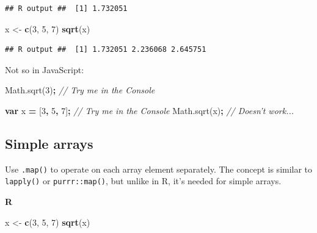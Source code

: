 \documentclass[openany]{book}
\newenvironment{Shaded}{\begin{snugshade}}{\end{snugshade}}
\newcommand{\AttributeTok}[1]{\textcolor[rgb]{0.77,0.63,0.00}{#1}}
\newcommand{\CommentTok}[1]{\textcolor[rgb]{0.56,0.35,0.01}{\textit{#1}}}
\newcommand{\DecValTok}[1]{\textcolor[rgb]{0.00,0.00,0.81}{#1}}
\newcommand{\KeywordTok}[1]{\textcolor[rgb]{0.13,0.29,0.53}{\textbf{#1}}}
\newcommand{\NormalTok}[1]{#1}
\newcommand{\OperatorTok}[1]{\textcolor[rgb]{0.81,0.36,0.00}{\textbf{#1}}}
\newcommand{\StringTok}[1]{\textcolor[rgb]{0.31,0.60,0.02}{#1}}
\newcommand{\VariableTok}[1]{\textcolor[rgb]{0.00,0.00,0.00}{#1}}
\begin{document}
\begin{verbatim}
## R output ##  [1] 1.732051
\end{verbatim}

\begin{Shaded}
\begin{Highlighting}[]
\NormalTok{x <-}\StringTok{ }\KeywordTok{c}\NormalTok{(}\DecValTok{3}\NormalTok{, }\DecValTok{5}\NormalTok{, }\DecValTok{7}\NormalTok{)}
\KeywordTok{sqrt}\NormalTok{(x)}
\end{Highlighting}
\end{Shaded}

\begin{verbatim}
## R output ##  [1] 1.732051 2.236068 2.645751
\end{verbatim}

Not so in JavaScript:

\begin{Shaded}
\begin{Highlighting}[]
\VariableTok{Math}\NormalTok{.}\AttributeTok{sqrt}\NormalTok{(}\DecValTok{3}\NormalTok{)}\OperatorTok{;}     \CommentTok{// Try me in the Console}
\end{Highlighting}
\end{Shaded}

\begin{Shaded}
\begin{Highlighting}[]
\KeywordTok{var}\NormalTok{ x }\OperatorTok{=}\NormalTok{ [}\DecValTok{3}\OperatorTok{,} \DecValTok{5}\OperatorTok{,} \DecValTok{7}\NormalTok{]}\OperatorTok{;}     \CommentTok{// Try me in the Console}
\VariableTok{Math}\NormalTok{.}\AttributeTok{sqrt}\NormalTok{(x)}\OperatorTok{;}          \CommentTok{// Doesn't work...}
\end{Highlighting}
\end{Shaded}

\hypertarget{simple-arrays}{%
\subsection{Simple arrays}\label{simple-arrays}}

Use \texttt{.map()} to operate on each array element separately. The concept is similar to \texttt{lapply()} or \texttt{purrr::map()}, but unlike in R, it's needed for simple arrays.

\textbf{R}

\begin{Shaded}
\begin{Highlighting}[]
\NormalTok{x <-}\StringTok{ }\KeywordTok{c}\NormalTok{(}\DecValTok{3}\NormalTok{, }\DecValTok{5}\NormalTok{, }\DecValTok{7}\NormalTok{)}
\KeywordTok{sqrt}\NormalTok{(x)}
\end{Highlighting}
\end{Shaded}
\end{document}
